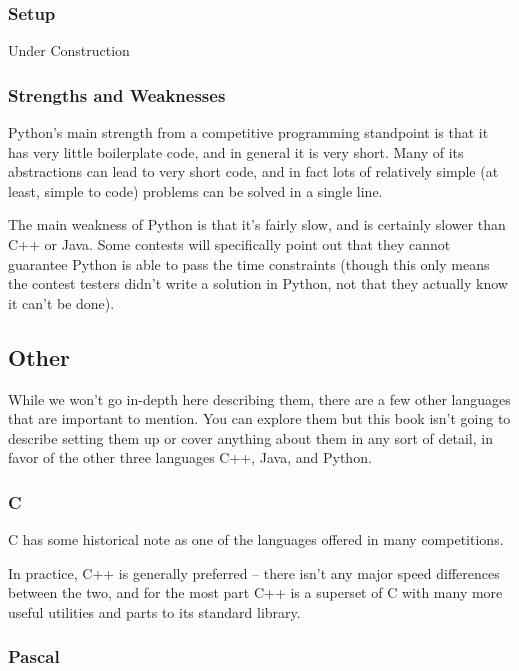 \subsubsection{Setup}

Under Construction

\subsubsection{Strengths and Weaknesses}

Python's main strength from a competitive programming standpoint is that it has very little boilerplate code, and in general it is very short. Many of its abstractions can lead to very short code, and in fact lots of relatively simple (at least, simple to code) problems can be solved in a single line.

The main weakness of Python is that it's fairly slow, and is certainly slower than C++ or Java. Some contests will specifically point out that they cannot guarantee Python is able to pass the time constraints (though this only means the contest testers didn't write a solution in Python, not that they actually know it can't be done).

\subsection{Other}

While we won't go in-depth here describing them, there are a few other languages that are important to mention. You can explore them but this book isn't going to describe setting them up or cover anything about them in any sort of detail, in favor of the other three languages C++, Java, and Python.

\subsubsection{C}

C has some historical note as one of the languages offered in many competitions.

In practice, C++ is generally preferred -- there isn't any major speed differences between the two, and for the most part C++ is a superset of C with many more useful utilities and parts to its standard library.

\subsubsection{Pascal}

